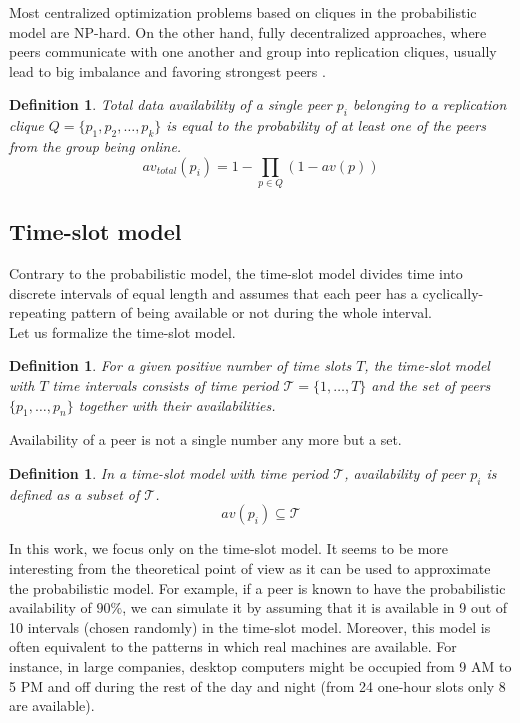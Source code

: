 \documentclass{pracamgren}
\newcounter{collective_ctr} \numberwithin{collective_ctr}{chapter}
\newtheorem{definition}[collective_ctr]{Definition}
\begin{document}
Most centralized optimization problems based on cliques in the probabilistic model are NP-hard. On the other hand, fully decentralized approaches, where peers communicate with one another and group into replication cliques, usually lead to big imbalance and favoring strongest peers \cite{krz}.\\

\begin{definition}
Total data availability of a single peer $p_i$ belonging to a replication clique $Q =\{p_{1}, p_{2}, \ldots, p_{k}\}$ is equal to the probability of at least one of the peers from the group being online.
$$av_{total}(p_i) = 1 - \prod_{p \in Q} (1 - av(p))$$
\end{definition}

\subsection{Time-slot model}

Contrary to the probabilistic model, the time-slot model divides time into discrete intervals of equal length and assumes that each peer has a cyclically-repeating pattern of being available or not during the whole interval.\\

Let us formalize the time-slot model.
\begin{definition}
For a given positive number of time slots $T$, the time-slot model with $T$ time intervals consists of time period $\mathcal{T} = \{1,\ldots,T\}$ and the set of peers $\{p_1,\ldots,p_n\}$ together with their availabilities.\\
\end{definition}

Availability of a peer is not a single number any more but a set.\\

\begin{definition}
In a time-slot model with time period $\mathcal{T}$, availability of peer $p_i$ is defined as a subset of $\mathcal{T}$.
$$av(p_i) \subseteq\mathcal{T}$$
\end{definition}

In this work, we focus only on the time-slot model. It seems to be more interesting from the theoretical point of view as it can be used to approximate the probabilistic model. For example, if a peer is known to have the probabilistic availability of $90\%$, we can simulate it by assuming that it is available in 9 out of 10 intervals (chosen randomly) in the time-slot model. Moreover, this model is often equivalent to the patterns in which real machines are available. For instance, in large companies, desktop computers might be occupied from 9 AM to 5 PM and off during the rest of the day and night (from 24 one-hour slots only 8 are available).\\
\end{document}
